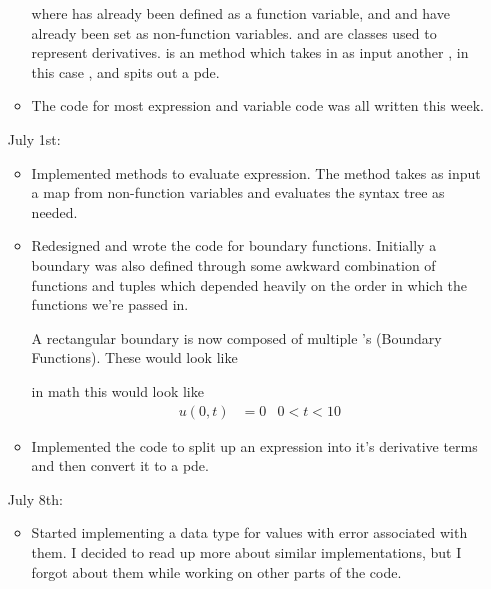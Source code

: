\documentclass[12pt]{article}
\begin{document}
\begin{itemize}
\begin{itemize}
        
        where  has already been defined as a function variable,
        and  and  have already been set as
        non-function variables.
         and  are classes used to represent
        derivatives. \code{===} is an \expr method which takes in as
        input another \expr, in this case , and spits
        out a pde.
        
    \item The code for most expression and variable code was all
        written this week.
    \end{itemize}

\item[July 1st:]\begin{itemize}

    \item Implemented methods to evaluate expression. The method takes
        as input a map from non-function variables and evaluates the
        syntax tree as needed.

    \item Redesigned and wrote the code for boundary
        functions. Initially a boundary was also defined through some
        awkward combination of functions and tuples which depended
        heavily on the order in which the functions we're passed in.

        A rectangular boundary is now composed of multiple
        's (Boundary Functions). These would look like
        

        in math this would look like
        \begin{align*}
            u(0, t) & = 0& 0<t<10
        \end{align*}

    \item Implemented the code to split up an expression into it's
        derivative terms and then convert it to a pde. 
    \end{itemize}

    
\item[July 8th:]\begin{itemize}

    \item Started implementing a data type for values with error
        associated with them. I decided to read up more about similar
        implementations, but I forgot about them while working on
        other parts of the code.
        

\end{itemize}
\end{itemize}
\end{document}
